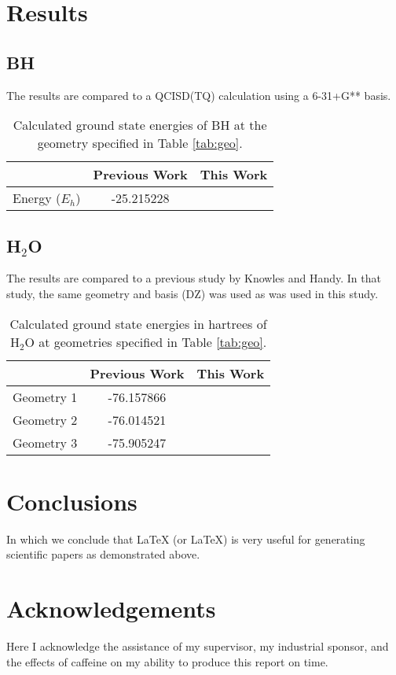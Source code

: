 \documentclass[final,3p,times,twocolumn]{elsarticle}
\begin{document}
\section{Results}
\subsection{BH} \label{sec:bhresults}
The results are compared to a QCISD(TQ) calculation using a 6-31+G** basis.\cite{cccbdb}
\begin{table}
\begin{tabular}{l|cc} \hline\hline
& Previous Work\cite{cccbdb} & This Work \\ \hline
Energy ($E_h$) & -25.215228 & \\ \hline\hline
\end{tabular}
\caption{Calculated ground state energies of BH at the geometry specified in Table \ref{tab:geo}.}
\label{tab:bhresults}
\end{table}

\subsection{H$_2$O} \label{sec:h2oresults}
The results are compared to a previous study by Knowles and Handy.\cite{handy-1983} In that study, the same geometry and basis (DZ) was used as was used in this study.

\begin{table}
\begin{tabular}{l|cc} \hline\hline
& Previous Work\cite{handy-1983} & This Work \\ \hline
Geometry 1 & -76.157866 & \\ 
Geometry 2 & -76.014521 & \\
Geometry 3 & -75.905247 & \\\hline\hline
\end{tabular}
\caption{Calculated ground state energies in hartrees of H$_2$O at geometries specified in Table \ref{tab:geo}.}
\end{table}


\section{Conclusions}
\label{sect:Concl}
In which we conclude that LaTeX (or \LaTeX) is very useful for
generating scientific papers as demonstrated above.

\section*{Acknowledgements}
Here I acknowledge the assistance of my supervisor, my industrial sponsor,
and the effects of caffeine on my ability to produce this report on time.
\end{document}
